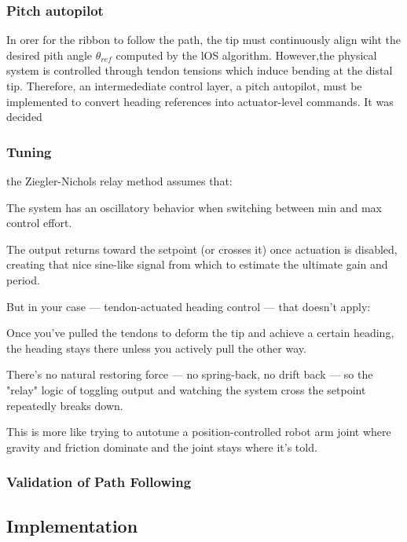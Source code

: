 \subsubsection{Pitch autopilot}
In orer for the ribbon to follow the path, the tip must continuously align wiht the desired pith angle \(\theta_{ref}\) computed by the lOS algorithm. However,the physical system is controlled through tendon tensions which induce bending at the distal tip. Therefore, an intermedediate control layer, a pitch autopilot, must be implemented to convert heading references into actuator-level commands.
\newline \newline
It was decided

\subsubsection{Tuning}
the Ziegler-Nichols relay method assumes that:

The system has an oscillatory behavior when switching between min and max control effort.

The output returns toward the setpoint (or crosses it) once actuation is disabled, creating that nice sine-like signal from which to estimate the ultimate gain and period.

But in your case — tendon-actuated heading control — that doesn’t apply:

Once you've pulled the tendons to deform the tip and achieve a certain heading, the heading stays there unless you actively pull the other way.

There’s no natural restoring force — no spring-back, no drift back — so the "relay" logic of toggling output and watching the system cross the setpoint repeatedly breaks down.

This is more like trying to autotune a position-controlled robot arm joint where gravity and friction dominate and the joint stays where it's told.

\subsubsection{Validation of Path Following}


\subsection{Implementation}

